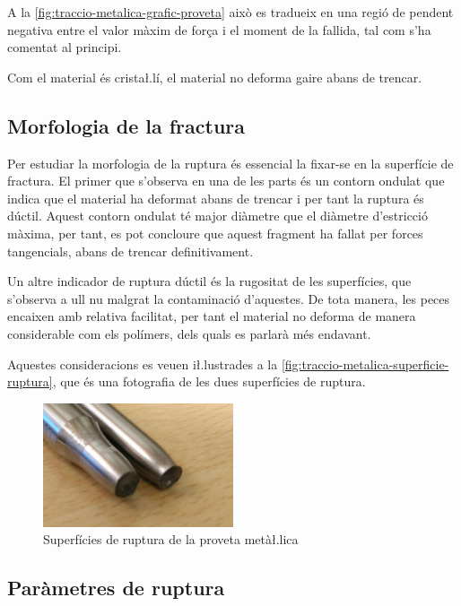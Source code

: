 \documentclass[a4paper]{report}
\begin{document}
A la \autoref{fig:traccio-metalica-grafic-proveta} això es tradueix en una regió de pendent negativa entre el valor màxim de força i el moment de la fallida, tal com s’ha comentat al principi.

Com el material és crista\l.lí, el material no deforma gaire abans de trencar.

\subsection{Morfologia de la fractura}
Per estudiar la morfologia de la ruptura és essencial la fixar-se en la superfície de fractura. El primer que s’observa en una de les parts és un contorn ondulat que indica que el material ha deformat abans de trencar i per tant la ruptura és dúctil. Aquest contorn ondulat té major diàmetre que el diàmetre d’estricció màxima, per tant, es pot concloure que aquest fragment ha fallat per forces tangencials, abans de trencar definitivament.

Un altre indicador de ruptura dúctil és la rugositat de les superfícies, que s’observa a ull nu malgrat la contaminació d’aquestes. De tota manera, les peces encaixen amb relativa facilitat, per tant el material no deforma de manera considerable com els polímers, dels quals es parlarà més endavant.

Aquestes consideracions es veuen i\l.lustrades a la \autoref{fig:traccio-metalica-superficie-ruptura}, que és una fotografia de les dues superfícies de ruptura. 

\begin{figure}[ht]
    \centering
    \includegraphics[width=0.5\textwidth]{images/traccio/metalica-superficie-ruptura}
    \caption{Superfícies de ruptura de la proveta metà\l.lica}
    \label{fig:traccio-metalica-superficie-ruptura}
\end{figure}

\subsection{Paràmetres de ruptura}
\end{document}
